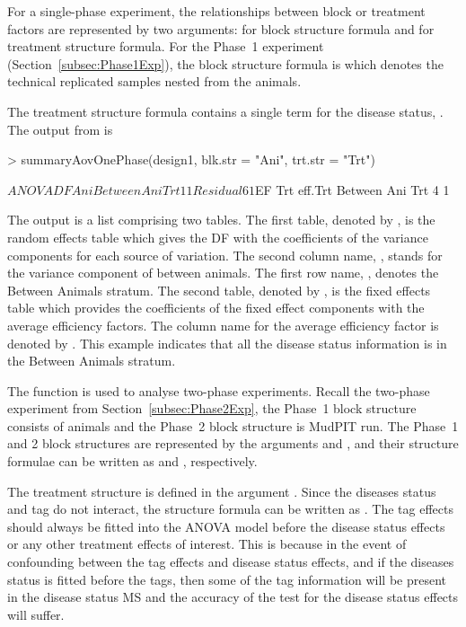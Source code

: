 \documentclass[article]{jss}
\begin{document}
For a single-phase experiment, the relationships between block or treatment factors are represented by two arguments:  for block structure formula and  for treatment structure formula. For the Phase~1 experiment (Section~\ref{subsec:Phase1Exp}), the block structure formula is  which denotes the technical replicated samples nested from the animals. 

The treatment structure formula contains a single term for the disease status, . The output from  is 
\begin{CodeChunk}
\begin{CodeInput}
> summaryAovOnePhase(design1, blk.str = "Ani", trt.str = "Trt") 
\end{CodeInput}
\begin{CodeOutput}
$ANOVA
            DF Ani
Between Ani       
   Trt      1  1  
   Residual 6  1  

$EF
            Trt eff.Trt
Between Ani            
   Trt      4   1      
\end{CodeOutput}
\end{CodeChunk}
The output is a list comprising two tables. The first table, denoted by , is the random effects table which gives the DF with the coefficients of the variance components for each source of variation. The second column name, , stands for the variance component of between animals. The first row name, , denotes the Between Animals stratum. The second table, denoted by , is the fixed effects table which provides the coefficients of the fixed effect components with the average efficiency factors. The column name for the average efficiency factor is denoted by . This example indicates that all the disease status information is in the Between Animals stratum.

The function  is used to analyse two-phase experiments. Recall the two-phase experiment from Section~\ref{subsec:Phase2Exp}, the Phase~1 block structure consists of animals and the Phase~2 block structure is MudPIT run. The Phase~1 and 2 block structures are represented by the arguments  and , and their structure formulae can be written as  and , respectively.

The treatment structure is defined in the argument . Since the diseases status and tag do not interact, the structure formula can be written as . The tag effects should always be fitted into the ANOVA model before the disease status effects or any other treatment effects of interest. This is because in the event of confounding between the tag effects and disease status effects, and if the diseases status is fitted before the tags, then some of the tag information will be present in the disease status MS and the accuracy of the test for the disease status effects will suffer. 
\end{document}
